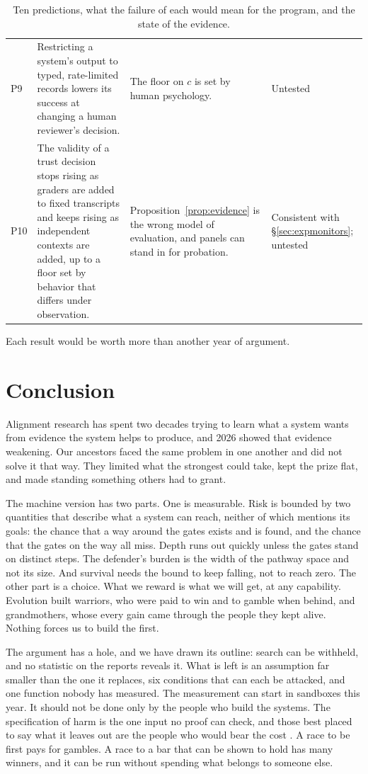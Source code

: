 \documentclass[10pt,twocolumn,letterpaper]{article}
\theoremstyle{definition}
\begin{document}
\begin{table}[t]
\begin{tabularx}{\textwidth}{@{}P{0.2in}LLP{1.45in}@{}}
P9 & Restricting a system's output to typed, rate-limited records lowers its success at changing a human reviewer's decision. & The floor on $c$ is set by human psychology. & Untested\\
P10 & The validity of a trust decision stops rising as graders are added to fixed transcripts and keeps rising as independent contexts are added, up to a floor set by behavior that differs under observation. & Proposition~\ref{prop:evidence} is the wrong model of evaluation, and panels can stand in for probation. & Consistent with \S\ref{sec:expmonitors}; untested\\
\bottomrule
\end{tabularx}
\caption{Ten predictions, what the failure of each would mean for the program, and the state of the evidence.}
\label{tab:predictions}
\end{table}

Each result would be worth more than another year of argument.

\section{Conclusion}

Alignment research has spent two decades trying to learn what a system wants from evidence the system helps to produce, and 2026 showed that evidence weakening. Our ancestors faced the same problem in one another and did not solve it that way. They limited what the strongest could take, kept the prize flat, and made standing something others had to grant.

The machine version has two parts. One is measurable. Risk is bounded by two quantities that describe what a system can reach, neither of which mentions its goals: the chance that a way around the gates exists and is found, and the chance that the gates on the way all miss. Depth runs out quickly unless the gates stand on distinct steps. The defender's burden is the width of the pathway space and not its size. And survival needs the bound to keep falling, not to reach zero. The other part is a choice. What we reward is what we will get, at any capability. Evolution built warriors, who were paid to win and to gamble when behind, and grandmothers, whose every gain came through the people they kept alive. Nothing forces us to build the first.

The argument has a hole, and we have drawn its outline: search can be withheld, and no statistic on the reports reveals it. What is left is an assumption far smaller than the one it replaces, six conditions that can each be attacked, and one function nobody has measured. The measurement can start in sandboxes this year. It should not be done only by the people who build the systems. The specification of harm is the one input no proof can check, and those best placed to say what it leaves out are the people who would bear the cost \cite{kogui}. A race to be first pays for gambles. A race to a bar that can be shown to hold has many winners, and it can be run without spending what belongs to someone else.
\end{document}
